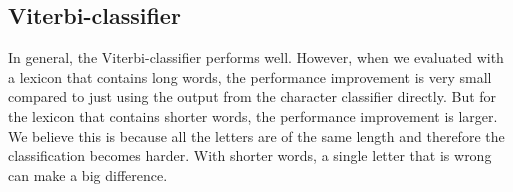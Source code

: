 \subsection{Viterbi-classifier}
In general, the Viterbi-classifier performs well.
However, when we evaluated with a lexicon that contains long words, the performance improvement is very small compared to just using the output from the character classifier directly.
But for the lexicon that contains shorter words, the performance improvement is larger. 
We believe this is because all the letters are of the same length and therefore the classification becomes harder.
With shorter words, a single letter that is wrong can make a big difference.
